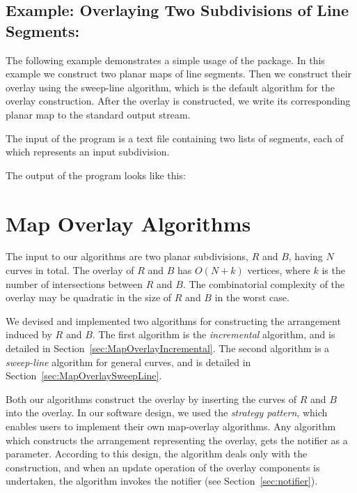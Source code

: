 \subsection*{Example: Overlaying Two Subdivisions of Line Segments:}
The following example demonstrates a simple usage of the 
 package.
In this example we construct two planar maps of line segments. 
Then we construct their overlay using the sweep-line algorithm, which is 
the default algorithm for the overlay construction. 
After the overlay is constructed, we write its corresponding planar map to the 
standard output stream. 

The input of the program is a text file containing two lists of segments, 
each of which represents an input subdivision.

The output of the program looks like this:

\section{Map Overlay Algorithms}
\label{sec:algorithms}
The input to our algorithms are two planar subdivisions, 
$R$ and $B$, having $N$ curves in total. 
The overlay of $R$ and $B$ has $O(N+k)$ vertices, 
where $k$ is the number of intersections between $R$ and $B$.
The combinatorial complexity of the overlay may be quadratic 
in the size of $R$ and $B$ in the worst case.

We devised and implemented two algorithms for constructing the 
arrangement induced by $R$ and $B$.
The first algorithm is the {\em incremental} algorithm, and is detailed in Section~\ref{sec:MapOverlayIncremental}. 
The second algorithm is a {\em sweep-line} algorithm 
for general curves, and is detailed in 
Section~\ref{sec:MapOverlaySweepLine}.

Both our algorithms construct the overlay by inserting 
the curves of $R$ and $B$ into the overlay.
In our software design, we used the {\it strategy pattern}, 
which enables users to implement their own map-overlay algorithms.
Any algorithm which constructs the arrangement representing 
the overlay, gets the notifier as a parameter. 
According to this design, the algorithm deals only with the construction, 
and when an update operation of the overlay components is undertaken, 
the algorithm invokes the notifier (see Section~\ref{sec:notifier}). 

